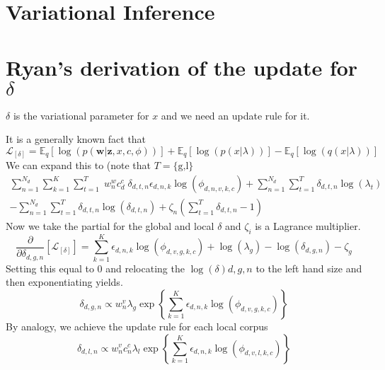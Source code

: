 \documentclass[11pt,a4paper]{article}
\begin{document}
\section{Variational Inference}

\section*{Ryan's derivation of the update for $\delta$}
$\delta$ is the variational parameter for $x$ and we need an update rule for it. 

It is a generally known fact that
$$
\mathcal{L}_{[\delta]} = \mathbb{E}_q\left[ \log(p(\mathbf{w}|\mathbf{z},x,c,\phi )) \right] + \mathbb{E}_q\left[\log(p(x|\lambda))\right] - \mathbb{E}_q\left[\log(q(x|\lambda))\right]
$$
We can expand this to (note that $T =\{\text{g,l}\}$
\begin{multline*}
    \sum_{n=1}^{N_d} \sum_{k=1}^K \sum_{t=1}^T \;w_n^w c_d^c \;\delta_{d,t,n} \epsilon_{d,n,k} \log(\phi_{d,n,v,k,c}) + \sum_{n=1}^{N_d} \sum_{t=1}^T \delta_{d,t,n}\log(\lambda_t) \\ - \sum_{n=1}^{N_d}\sum_{t=1}^T \delta_{d,t,n}\log(\delta_{d,t,n}) + \zeta_n(\sum_{t=1}^T\delta_{d,t,n} - 1)
\end{multline*}
Now we take the partial for the global and local $\delta$ and $\zeta_i$ is a Lagrance multiplier.
$$
\frac{\partial}{\partial \delta_{d,g,n}}\left[ \mathcal{L}_{[\delta]}\right] = \sum_{k=1}^K \epsilon_{d,n,k} \log(\phi_{d,v,g,k,c}) + \log(\lambda_g) - \log(\delta_{d,g,n}) - \zeta_g
$$
Setting this equal to 0 and relocating the $\log(\delta){d,g,n}$ to the left hand size and then exponentiating yields.
$$
\delta_{d,g,n} \propto w_n^v \lambda_g \exp\left\{ \sum_{k=1}^K \epsilon_{d,n,k} \log(\phi_{d,v,g,k,c})  \right\}
$$
By analogy, we achieve the update rule for each local corpus
$$
\delta_{d,l,n} \propto  w_n^v c_n^c \lambda_l \exp\left\{ \sum_{k=1}^K \epsilon_{d,n,k} \log(\phi_{d,v,l,k,c})  \right\}
$$
\end{document}
